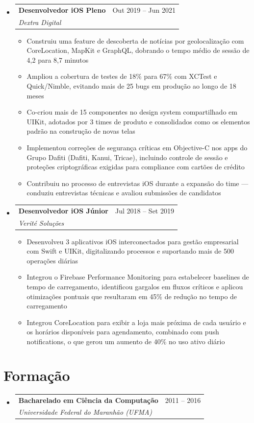 \documentclass[11pt,letterpaper]{article}
\makeatletter
\newcommand{\resumeSubheading}[4]{
  \item
    \begin{tabular*}{\linewidth}{l@{\extracolsep{\fill}}r}
      \textbf{#1} & #2 \\
      \textit{#3} & \textit{#4} \\
    \end{tabular*}
}
\newcommand{\resumeItem}[1]{
  \item{#1}
}
\makeatother
\begin{document}
\begin{itemize}[leftmargin=0.15in]
    \resumeSubheading
        {Desenvolvedor iOS Pleno}{Out 2019 -- Jun 2021}
        {Dextra Digital}{}
        \begin{itemize}
            \resumeItem{Construiu uma feature de descoberta de notícias por geolocalização com CoreLocation, MapKit e GraphQL, dobrando o tempo médio de sessão de 4,2 para 8,7 minutos}
            \resumeItem{Ampliou a cobertura de testes de 18\% para 67\% com XCTest e Quick/Nimble, evitando mais de 25 bugs em produção ao longo de 18 meses}
            \resumeItem{Co-criou mais de 15 componentes no design system compartilhado em UIKit, adotados por 3 times de produto e consolidados como os elementos padrão na construção de novas telas}
            \resumeItem{Implementou correções de segurança críticas em Objective-C nos apps do Grupo Dafiti (Dafiti, Kanui, Tricae), incluindo controle de sessão e proteções criptográficas exigidas para compliance com cartões de crédito}
            \resumeItem{Contribuiu no processo de entrevistas iOS durante a expansão do time --- conduziu entrevistas técnicas e avaliou submissões de candidatos}
        \end{itemize}

    \resumeSubheading
        {Desenvolvedor iOS Júnior}{Jul 2018 -- Set 2019}
        {Verité Soluções}{}
        \begin{itemize}
            \resumeItem{Desenvolveu 3 aplicativos iOS interconectados para gestão empresarial com Swift e UIKit, digitalizando processos e suportando mais de 500 operações diárias}
            \resumeItem{Integrou o Firebase Performance Monitoring para estabelecer baselines de tempo de carregamento, identificou gargalos em fluxos críticos e aplicou otimizações pontuais que resultaram em 45\% de redução no tempo de carregamento}
            \resumeItem{Integrou CoreLocation para exibir a loja mais próxima de cada usuário e os horários disponíveis para agendamento, combinado com push notifications, o que gerou um aumento de 40\% no uso ativo diário}
        \end{itemize}
\end{itemize}

\section*{Formação}

\begin{itemize}[leftmargin=0.15in]
    \resumeSubheading
        {Bacharelado em Ciência da Computação}{2011 -- 2016}
        {Universidade Federal do Maranhão (UFMA)}{}

\end{itemize}
\end{document}
